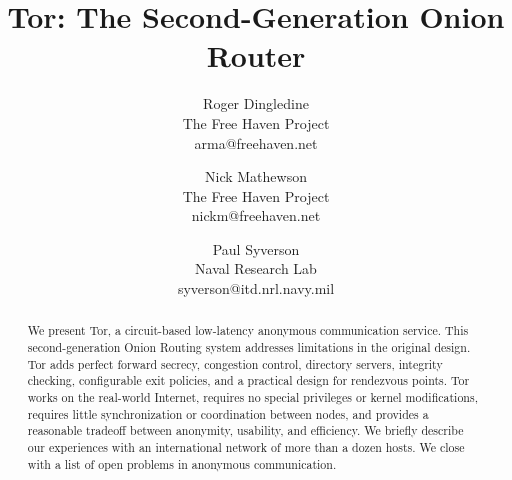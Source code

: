 \documentclass[times,10pt,twocolumn]{article}
\begin{document}

\title{Tor: The Second-Generation Onion Router} %

\author{Roger Dingledine \\ The Free Haven Project \\ arma@freehaven.net \and
Nick Mathewson \\ The Free Haven Project \\ nickm@freehaven.net \and
Paul Syverson \\ Naval Research Lab \\ syverson@itd.nrl.navy.mil}

\maketitle
\thispagestyle{empty}

\begin{abstract}
We present Tor, a circuit-based low-latency anonymous communication
service. This second-generation Onion Routing system addresses limitations
in the original design. Tor adds perfect forward secrecy, congestion
control, directory servers, integrity checking, configurable exit policies,
and a practical design for rendezvous points. Tor works on the real-world
Internet, requires no special privileges or kernel modifications, requires
little synchronization or coordination between nodes, and provides a
reasonable tradeoff between anonymity, usability, and efficiency.
We briefly describe our experiences with an international network of
more than a dozen hosts. %
We close with a list of open problems in anonymous communication.
\end{abstract}



\label{sec:intro}
\end{document}
